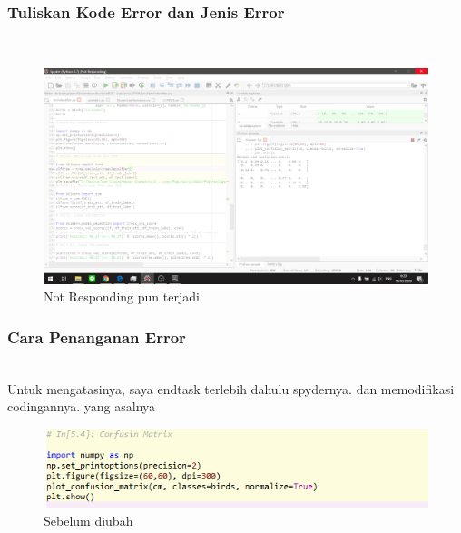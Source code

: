 \subsubsection{Tuliskan Kode Error dan Jenis Error}
\hfill\\
\begin{figure}[H]
	\centering
	\includegraphics[width=12cm]{figures/1174083/figures3/error3.png}
	\caption{Not Responding pun terjadi}
\end{figure}

\subsubsection{Cara Penanganan Error}
\hfill\\
Untuk mengatasinya, saya endtask terlebih dahulu spydernya. dan memodifikasi codingannya. yang asalnya
\begin{figure}[H]
	\centering
	\includegraphics[width=12cm]{figures/1174083/figures3/error4.png}
	\caption{Sebelum diubah}
\end{figure}

